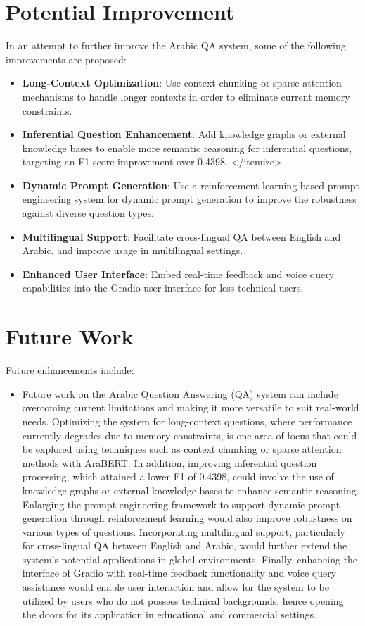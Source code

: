 \documentclass[conference]{IEEEtran}
\begin{document}
\section{Potential Improvement}
In an attempt to further improve the Arabic QA system, some of the following improvements are proposed:
\begin{itemize}
\item \textbf{Long-Context Optimization}: Use context chunking or sparse attention mechanisms to handle longer contexts in order to eliminate current memory constraints.
\item \textbf{Inferential Question Enhancement}: Add knowledge graphs or external knowledge bases to enable more semantic reasoning for inferential questions, targeting an F1 score improvement over 0.4398.
</itemize>.
\item \textbf{Dynamic Prompt Generation}: Use a reinforcement learning-based prompt engineering system for dynamic prompt generation to improve the robustness against diverse question types.
\item \textbf{Multilingual Support}: Facilitate cross-lingual QA between English and Arabic, and improve usage in multilingual settings.
\item \textbf{Enhanced User Interface}: Embed real-time feedback and voice query capabilities into the Gradio user interface for less technical users.
\end{itemize}

\section{Future Work}
Future enhancements include:
\begin{itemize}
    \item Future work on the Arabic Question Answering (QA) system can include overcoming current limitations and making it more versatile to suit real-world needs. Optimizing the system for long-context questions, where performance currently degrades due to memory constraints, is one area of focus that could be explored using techniques such as context chunking or sparse attention methods with AraBERT. In addition, improving inferential question processing, which attained a lower F1 of 0.4398, could involve the use of knowledge graphs or external knowledge bases to enhance semantic reasoning. Enlarging the prompt engineering framework to support dynamic prompt generation through reinforcement learning would also improve robustness on various types of questions. Incorporating multilingual support, particularly for cross-lingual QA between English and Arabic, would further extend the system's potential applications in global environments. Finally, enhancing the interface of Gradio with real-time feedback functionality and voice query assistance would enable user interaction and allow for the system to be utilized by users who do not possess technical backgrounds, hence opening the doors for its application in educational and commercial settings.
\end{itemize}
\end{document}
